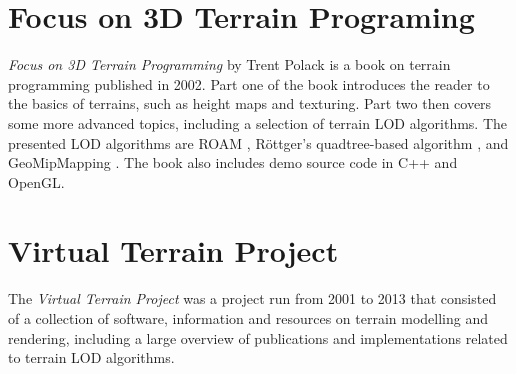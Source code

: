 \section{Focus on 3D Terrain Programing}
\textit{Focus on 3D Terrain Programming} by Trent Polack \cite{focuson3dterrainprogramming} is a book on terrain programming published in 2002.
Part one of the book introduces the reader to the basics of terrains, such as height maps and texturing. Part two then 
covers some more advanced topics, including a selection of terrain LOD algorithms. The presented LOD algorithms are
ROAM \cite{roam}, Röttger's quadtree-based algorithm \cite{rottgerpaper}, and GeoMipMapping \cite{geomipmapping}.
The book also includes demo source code in C++ and OpenGL.

\section{Virtual Terrain Project}
The \textit{Virtual Terrain Project} \cite{vtp} was a project run from 2001 to 2013 
that consisted of a collection of software, information and resources on terrain modelling and rendering,
including a large overview of publications and implementations related to terrain LOD algorithms.
